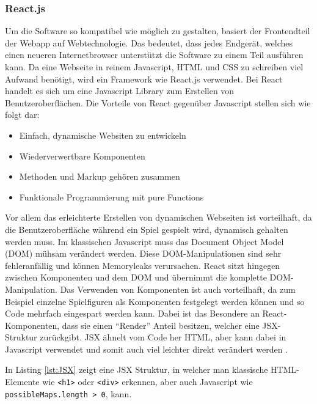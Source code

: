 \documentclass[12pt,a4paper,bibliography=totocnumbered,listof=totocnumbered]{article}
\begin{document}
\subsubsection{React.js}
Um die Software so kompatibel wie möglich zu gestalten, basiert der Frontendteil der Webapp auf Webtechnologie. Das bedeutet, dass jedes Endgerät, welches einen neueren 
Internetbrowser unterstützt die Software zu einem Teil ausführen kann. Da eine Webseite in reinem Javascript, HTML und CSS zu schreiben viel Aufwand benötigt, 
wird ein Framework wie React.js verwendet. Bei React handelt es sich um eine Javascript Library zum Erstellen von Benutzeroberflächen.
Die Vorteile von React gegenüber Javascript stellen sich wie folgt dar:
\begin{itemize}
    \item Einfach, dynamische Websiten zu entwickeln
    \item Wiederverwertbare Komponenten
    \item Methoden und Markup gehören zusammen
    \item Funktionale Programmierung mit pure Functions
\end{itemize}
Vor allem das erleichterte Erstellen von dynamischen Webseiten ist vorteilhaft, da die Benutzeroberfläche während ein Spiel gespielt wird, dynamisch gehalten werden muss.
Im klassischen Javascript muss das Document Object Model (DOM) mühsam verändert werden. Diese DOM-Manipulationen sind sehr fehleranfällig und können Memoryleaks
verursachen. React sitzt hingegen zwischen Komponenten und dem DOM und übernimmt die komplette DOM-Manipulation.
Das Verwenden von Komponenten ist auch vorteilhaft, da zum Beispiel einzelne Spielfiguren als Komponenten festgelegt werden können 
und so Code mehrfach eingespart werden kann. 
Dabei ist das Besondere an React-Komponenten, dass sie einen ``Render'' Anteil besitzen, welcher eine JSX-Struktur zurückgibt. 
JSX ähnelt vom Code her HTML, aber kann dabei in Javascript verwendet und somit auch viel leichter direkt verändert werden \cite{React.js}.

\vspace{1em}


In Listing \ref{lst:JSX} zeigt eine JSX Struktur, in welcher man klassische HTML-Elemente wie \texttt{<h1>} oder \texttt{<div>} erkennen, aber auch Javascript wie 
\texttt{possibleMaps.length > 0}, kann.
\end{document}
